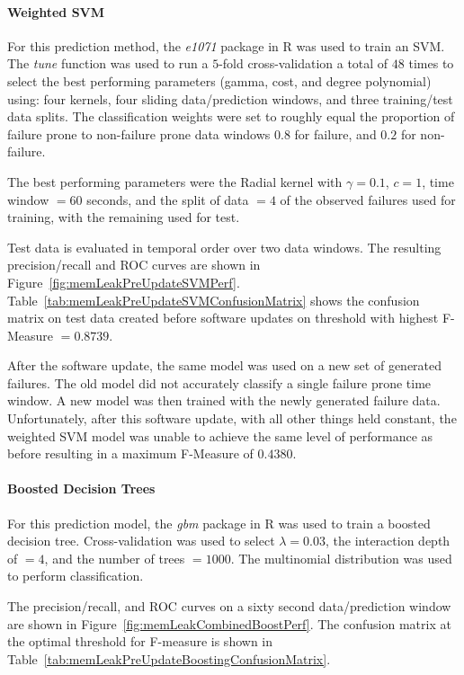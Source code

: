 \paragraph{Weighted \ac{SVM}}
For this prediction method, the \emph{e1071} package in R was used to train an
\ac{SVM}.  The \emph{tune} function was used to run a $5$-fold cross-validation
a total of $48$ times to select the best performing parameters (gamma, cost,
and degree polynomial) using: four kernels, four sliding data/prediction
windows, and three training/test data splits.  The classification weights were
set to roughly equal the proportion of failure prone to non-failure prone data
windows $0.8$ for failure, and $0.2$ for non-failure.

The best performing parameters were the Radial kernel with $\gamma = 0.1$, $c =
1$, time window $= 60$ seconds, and the split of data $= 4$ of the observed
failures used for training, with the remaining used for test.

Test data is evaluated in temporal order over two data windows.  The resulting
precision/recall and \ac{ROC} curves are shown in
Figure~\ref{fig:memLeakPreUpdateSVMPerf}.
Table~\ref{tab:memLeakPreUpdateSVMConfusionMatrix} shows the confusion matrix
on test data created before software updates on threshold with highest
F-Measure $= 0.8739$.

\figMemLeakPreUpdateSVMPerf
\tabMemLeakPreUpdateSVMConfusionMatrix

After the software update, the same model was used on a new set of generated
failures.  The old model did not accurately classify a single failure prone
time window.  A new model was then trained with the newly generated failure
data.  Unfortunately, after this software update, with all other things held
constant, the weighted SVM model was unable to achieve the same level of
performance as before resulting in a maximum F-Measure of $0.4380$.

\paragraph{Boosted Decision Trees}
For this prediction model, the \emph{gbm} package in R was used to train a
boosted decision tree.  Cross-validation was used to select $\lambda = 0.03$,
the interaction depth of $= 4$, and the number of trees $= 1000$.  The
multinomial distribution was used to perform classification.

The precision/recall, and \ac{ROC} curves on a sixty second data/prediction
window are shown in Figure~\ref{fig:memLeakCombinedBoostPerf}.  The
confusion matrix at the optimal threshold for F-measure is shown in
Table~\ref{tab:memLeakPreUpdateBoostingConfusionMatrix}.

